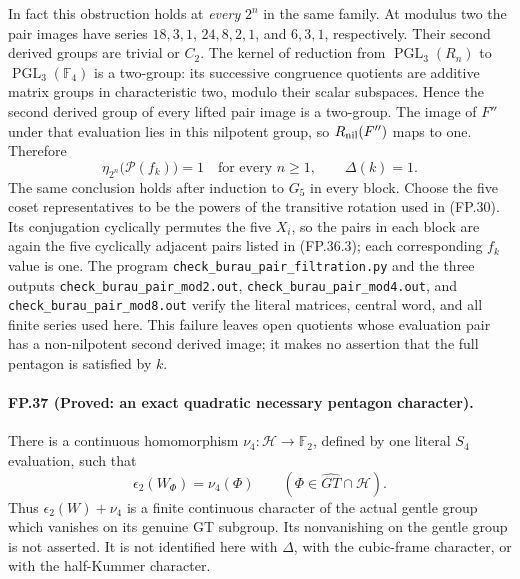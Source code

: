 In fact this obstruction holds at \emph{every} $2^n$ in the
same family. At modulus two the pair images have series
$18,3,1$, $24,8,2,1$, and $6,3,1$, respectively.
Their second derived groups are trivial or $C_2$. The kernel
of reduction from $\operatorname{PGL}_3(R_n)$ to
$\operatorname{PGL}_3(\mathbb F_4)$ is a two-group: its
successive congruence quotients are additive matrix groups in
characteristic two, modulo their scalar subspaces. Hence the
second derived group of every lifted pair image is a two-group.
The image of $F''$ under that evaluation lies in this nilpotent
group, so $R_{\rm nil}(F'')$ maps to one. Therefore
\[
           \eta_{2^n}\bigl(\mathcal P(f_k)\bigr)=1
           \quad\text{for every }n\geq1,
           \qquad \Delta(k)=1.
 \tag{FP.36.4}
\]
The same conclusion holds after induction to $G_5$ in every
block. Choose the five coset representatives to be the powers
of the transitive rotation used in (FP.30). Its conjugation
cyclically permutes the five $X_i$, so the pairs in each block
are again the five cyclically adjacent pairs listed in
(FP.36.3); each corresponding $f_k$ value is one.
The program \texttt{check\_burau\_pair\_filtration.py} and
the three outputs \texttt{check\_burau\_pair\_mod2.out},
\texttt{check\_burau\_pair\_mod4.out}, and
\texttt{check\_burau\_pair\_mod8.out} verify the literal
matrices, central word, and all finite series used here.
This failure leaves open quotients whose evaluation pair has a
non-nilpotent second derived image; it makes no assertion that
the full pentagon is satisfied by $k$.

\paragraph{FP.37 (Proved: an exact quadratic necessary pentagon character).}
There is a continuous homomorphism
$\nu_4:\mathcal H\to\mathbb F_2$, defined by one literal
$S_4$ evaluation, such that
\[
 \boxed{\quad \epsilon_2(W_\Phi)=\nu_4(\Phi)
                 \qquad(\Phi\in\widehat{GT}\cap\mathcal H).\quad}
 \tag{FP.37.1}
\]
Thus $\epsilon_2(W)+\nu_4$ is a finite continuous character
of the actual gentle group which vanishes on its genuine GT
subgroup. Its nonvanishing on the gentle group is not asserted.
It is not identified here with $\Delta$, with the cubic-frame
character, or with the half-Kummer character.

